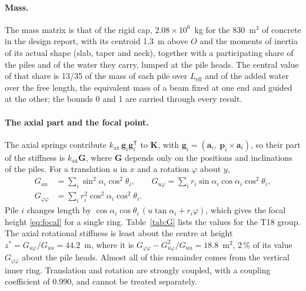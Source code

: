 \documentclass[11pt]{article}
\begin{document}
\paragraph{Mass.} The mass matrix is that of the rigid cap, $2.08\times10^{6}$~kg for the 830~m$^3$ of concrete in the design report, with its centroid 1.3~m above $O$ and the moments of inertia of its actual shape (slab, taper and neck), together with a participating share of the piles and of the water they carry, lumped at the pile heads. The central value of that share is 13/35 of the mass of each pile over $L_{\mathrm{eff}}$ and of the added water over the free length, the equivalent mass of a beam fixed at one end and guided at the other; the bounds 0 and 1 are carried through every result.

\paragraph{The axial part and the focal point.} The axial springs contribute $k_{\mathrm{ax}}\,\mathbf{g}_i\mathbf{g}_i^{\mathsf T}$ to $\mathbf{K}$, with $\mathbf{g}_i = (\mathbf{a}_i,\ \mathbf{p}_i\times\mathbf{a}_i)$, so their part of the stiffness is $k_{\mathrm{ax}}\mathbf{G}$, where $\mathbf{G}$ depends only on the positions and inclinations of the piles. For a translation $u$ in $x$ and a rotation $\varphi$ about $y$,
%
\begin{equation}
\begin{aligned}
G_{uu} &= \sum_i \sin^2\alpha_i\cos^2\theta_i , \qquad
G_{u\varphi} = \sum_i r_i\sin\alpha_i\cos\alpha_i\cos^2\theta_i , \\
G_{\varphi\varphi} &= \sum_i r_i^2\cos^2\alpha_i\cos^2\theta_i .
\end{aligned}
\label{eq:G}
\end{equation}
%
Pile $i$ changes length by $\cos\alpha_i\cos\theta_i\,(u\tan\alpha_i + r_i\varphi)$, which gives the focal height \eqref{eq:focal} for a single ring. Table~\ref{tab:G} lists the values for the T18 group. The axial rotational stiffness is least about the centre at height $z^* = G_{u\varphi}/G_{uu} = 44.2$~m, where it is $G_{\varphi\varphi} - G_{u\varphi}^2/G_{uu} = 18.8$~m$^2$, 2\,\% of its value $G_{\varphi\varphi}$ about the pile heads. Almost all of this remainder comes from the vertical inner ring. Translation and rotation are strongly coupled, with a coupling coefficient of 0.990, and cannot be treated separately.
\end{document}
